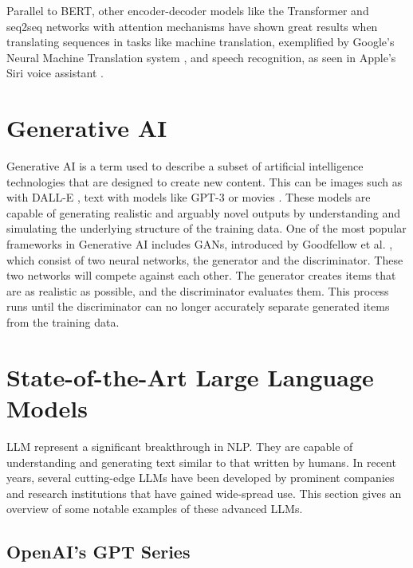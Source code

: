 Parallel to \gls{BERT}, other encoder-decoder models like the Transformer \cite{vaswani_attention_2023} and \gls{seq2seq} networks with attention mechanisms \cite{bahdanau_neural_2016} have shown great results when translating sequences in tasks like machine translation, exemplified by Google's Neural Machine Translation system \cite{wu_googles_2016}, and speech recognition, as seen in Apple's Siri voice assistant \cite{hinton_deep_2012}.


\section{Generative AI}


Generative AI is a term used to describe a subset of artificial intelligence technologies that are designed to create new content. This can be images such as with DALL-E \cite{ramesh_zero-shot_2021}, text with models like GPT-3 \cite{brown_language_2020} or movies \cite{openai_video_2024}. These models are capable of generating realistic and arguably novel outputs by understanding and simulating the underlying structure of the training data. One of the most popular frameworks in Generative AI includes \gls{GAN}s, introduced by Goodfellow et al. \cite{goodfellow_generative_2014}, which consist of two neural networks, the generator and the discriminator. These two networks will compete against each other. The generator creates items that are as realistic as possible, and the discriminator evaluates them. This process runs until the discriminator can no longer accurately separate generated items from the training data.


\section{State-of-the-Art Large Language Models}


\gls{LLM} represent a significant breakthrough in \gls{NLP}. They are capable of understanding and generating text similar to that written by humans. In recent years, several cutting-edge \gls{LLM}s have been developed by prominent companies and research institutions that have gained wide-spread use. This section gives an overview of some notable examples of these advanced \gls{LLM}s.


\label{sec:openai_models}
\subsection{OpenAI's GPT Series}


